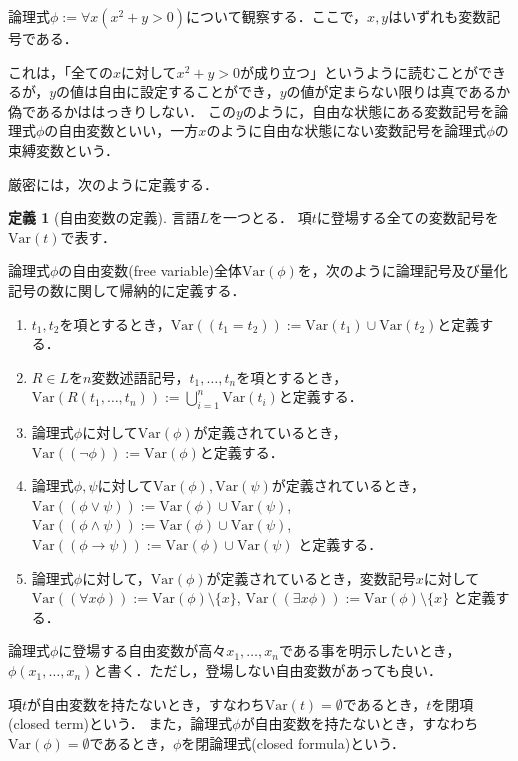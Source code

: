 \documentclass[uplatex, dvipdfmx]{jsarticle}
\numberwithin{equation}{section}
\newcommand{\Var}{\mathrm{Var}}
\theoremstyle{definition}
\newtheorem{definition}{定義}[section]
\begin{document}
論理式$\phi := \forall x (x^2 + y > 0)$について観察する．ここで，$x,y$はいずれも変数記号である．

これは，「全ての$x$に対して$x^2 + y > 0$が成り立つ」というように読むことができるが，$y$の値は自由に設定することができ，$y$の値が定まらない限りは真であるか偽であるかははっきりしない．
この$y$のように，自由な状態にある変数記号を論理式$\phi$の自由変数といい，一方$x$のように自由な状態にない変数記号を論理式$\phi$の束縛変数という．

厳密には，次のように定義する．

\begin{definition}[自由変数の定義]
     言語$L$を一つとる．
     項$t$に登場する全ての変数記号を$\Var(t)$で表す．

     論理式$\phi$の自由変数(free variable)全体$\Var(\phi)$を，次のように論理記号及び量化記号の数に関して帰納的に定義する．
     \begin{enumerate}
          \item $t_1, t_2$を項とするとき，$\Var((t_1=t_2)):=\Var(t_1)\cup\Var(t_2)$と定義する．
          \item $R \in L$を$n$変数述語記号，$t_1, \dots, t_n$を項とするとき，$\Var(R(t_1, \dots, t_n)):= \bigcup_{i=1}^n \Var(t_i)$と定義する．
          \item 論理式$\phi$に対して$\Var(\phi)$が定義されているとき，$\Var((\lnot \phi)):=\Var(\phi)$と定義する．
          \item 論理式$\phi, \psi$に対して$\Var(\phi), \Var(\psi)$が定義されているとき，
          $\Var((\phi \lor \psi)):=\Var(\phi)\cup\Var(\psi)$,
          $\Var((\phi \land \psi)):=\Var(\phi)\cup\Var(\psi)$,
          $\Var((\phi \rightarrow \psi)):=\Var(\phi)\cup\Var(\psi)$
          と定義する．
          \item 論理式$\phi$に対して，$\Var(\phi)$が定義されているとき，変数記号$x$に対して
          $\Var((\forall x\phi)):=\Var(\phi) \setminus \{x\}$,
          $\Var((\exists x\phi)):=\Var(\phi) \setminus \{x\}$
          と定義する．
     \end{enumerate}

     論理式$\phi$に登場する自由変数が高々$x_1, \dots, x_n$である事を明示したいとき，$\phi(x_1, \dots, x_n)$と書く．ただし，登場しない自由変数があっても良い．

     項$t$が自由変数を持たないとき，すなわち$\Var(t)=\emptyset$であるとき，$t$を閉項(closed term)という．
     また，論理式$\phi$が自由変数を持たないとき，すなわち$\Var(\phi)=\emptyset$であるとき，$\phi$を閉論理式(closed formula)という．
\end{definition}
\end{document}
